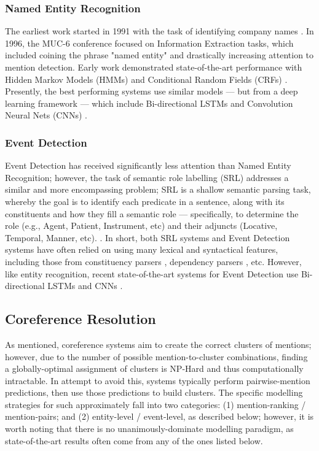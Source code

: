 \subsubsection{Named Entity Recognition}
The earliest work started in 1991 with the task of identifying company names \cite{Rau91}.  In 1996, the MUC-6 conference \cite{Grishman:1996:MUC:992628.992709} focused on Information Extraction tasks, which included coining the phrase "named entity" and drastically increasing attention to mention detection.  Early work demonstrated state-of-the-art performance with Hidden Markov Models (HMMs) \cite{Bikel97nymble:a} and Conditional Random Fields (CRFs) \cite{McCallum:2003:ERN:1119176.1119206}.  Presently, the best performing systems use similar models --- but from a deep learning framework --- which include Bi-directional LSTMs \cite{Hochreiter:1997:LSM:1246443.1246450, DBLP:journals/tacl/ChiuN16} and Convolution Neural Nets (CNNs) \cite{ma-hovy:2016:P16-1}.

\subsubsection{Event Detection}
Event Detection has received significantly less attention than Named Entity Recognition; however, the task of semantic role labelling (SRL) addresses a similar and more encompassing problem; SRL is a shallow semantic parsing task, whereby the goal is to identify each predicate in a sentence, along with its constituents and how they fill a semantic role --- specifically, to determine the role (e.g., Agent, Patient, Instrument, etc) and their adjuncts (Locative, Temporal, Manner, etc). \cite{Punyakanok:2008:ISP:1403157.1403162, Gildea:2002:ALS:643092.643093}.  In short, both SRL systems and Event Detection systems have often relied on using many lexical and syntactical features, including those from constituency parsers \cite{Toutanova:2005:JLI:1219840.1219913}, dependency parsers \cite{Johansson:2007:LSS:1621474.1621522}, etc.
However, like entity recognition, recent state-of-the-art systems for Event Detection use Bi-directional LSTMs and CNNs \cite{Feng2016ALN}.

\subsection{Coreference Resolution}
As mentioned, coreference systems aim to create the correct clusters of mentions; however, due to the number of possible mention-to-cluster combinations, finding a globally-optimal assignment of clusters is NP-Hard and thus computationally intractable.  In attempt to avoid this, systems typically perform pairwise-mention predictions, then use those predictions to build clusters. The specific modelling strategies for such approximately fall into two categories: (1) mention-ranking / mention-pairs; and (2) entity-level / event-level, as described below; however, it is worth noting that there is no unanimously-dominate modelling paradigm, as state-of-the-art results often come from any of the ones listed below.

